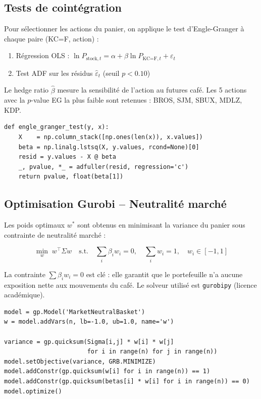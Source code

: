 \documentclass[12pt, a4paper]{article}
\begin{document}
\subsection{Tests de cointégration}

Pour sélectionner les actions du panier, on applique le test d'Engle-Granger
à chaque paire (KC=F, action) :

\begin{enumerate}
    \item Régression OLS : $\ln P_{\text{stock},t} = \alpha + \beta \ln P_{\text{KC=F},t} + \varepsilon_t$
    \item Test ADF sur les résidus $\hat{\varepsilon}_t$ (seuil $p < 0.10$)
\end{enumerate}

Le hedge ratio $\hat{\beta}$ mesure la sensibilité de l'action au futures café.
Les 5 actions avec la $p$-value EG la plus faible sont retenues : BROS, SJM,
SBUX, MDLZ, KDP.

\begin{lstlisting}
def engle_granger_test(y, x):
    X    = np.column_stack([np.ones(len(x)), x.values])
    beta = np.linalg.lstsq(X, y.values, rcond=None)[0]
    resid = y.values - X @ beta
    _, pvalue, *_ = adfuller(resid, regression='c')
    return pvalue, float(beta[1])
\end{lstlisting}

\subsection{Optimisation Gurobi -- Neutralité marché}

Les poids optimaux $w^*$ sont obtenus en minimisant la variance du panier sous
contrainte de neutralité marché :

\begin{equation}
    \min_{w} \; w^\top \Sigma w
    \quad \text{s.t.} \quad
    \sum_{i} \beta_i w_i = 0, \quad \sum_{i} w_i = 1, \quad w_i \in [-1, 1]
\end{equation}

La contrainte $\sum \beta_i w_i = 0$ est clé : elle garantit que le portefeuille
n'a aucune exposition nette aux mouvements du café. Le solveur utilisé est
\texttt{gurobipy} (licence académique).

\begin{lstlisting}
model = gp.Model('MarketNeutralBasket')
w = model.addVars(n, lb=-1.0, ub=1.0, name='w')

variance = gp.quicksum(Sigma[i,j] * w[i] * w[j]
                       for i in range(n) for j in range(n))
model.setObjective(variance, GRB.MINIMIZE)
model.addConstr(gp.quicksum(w[i] for i in range(n)) == 1)
model.addConstr(gp.quicksum(betas[i] * w[i] for i in range(n)) == 0)
model.optimize()
\end{lstlisting}
\end{document}
